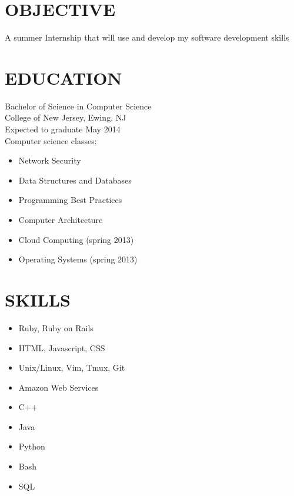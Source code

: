 \documentclass[line, margin]{res}
\begin{document}
  \address{63 Villa Ave.\\ Pitman, NJ 08071\\ (609)-670-5137}
  \begin{resume}
    \section{OBJECTIVE}
    A summer Internship that will use and develop my software development skills
    \section{EDUCATION}
    Bachelor of Science in Computer Science \\
    College of New Jersey, Ewing, NJ \\
    Expected to graduate May 2014 \\
    Computer science classes:
    \begin{multicols}{2}
      \begin{itemize}
          \item Network Security
          \item Data Structures and Databases
          \item Programming Best Practices
          \item Computer Architecture
          \item Cloud Computing (spring 2013)
          \item Operating Systems (spring 2013)
      \end{itemize}
    \end{multicols}
    \section{SKILLS}
    \begin{multicols}{2}
      \begin{itemize}
          \item Ruby, Ruby on Rails
          \item HTML, Javascript, CSS
          \item Unix/Linux, Vim, Tmux, Git
          \item Amazon Web Services
          \item C++
          \item Java
          \item Python
          \item Bash
          \item SQL
      \end{itemize}
    \end{multicols}

\end{resume}
\end{document}
